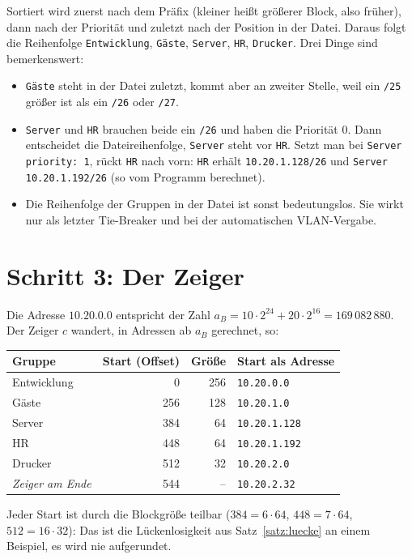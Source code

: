 \documentclass[a4paper,12pt, twoside]{report}
\theoremstyle{definition}
\begin{document}
Sortiert wird zuerst nach dem Präfix (kleiner heißt größerer Block, also früher), dann nach der Priorität und zuletzt nach der Position in der Datei. Daraus folgt die Reihenfolge \texttt{Entwicklung}, \texttt{Gäste}, \texttt{Server}, \texttt{HR}, \texttt{Drucker}. Drei Dinge sind bemerkenswert:
\begin{itemize}
	\item \texttt{Gäste} steht in der Datei zuletzt, kommt aber an zweiter Stelle, weil ein \texttt{/25} größer ist als ein \texttt{/26} oder \texttt{/27}.
	\item \texttt{Server} und \texttt{HR} brauchen beide ein \texttt{/26} und haben die Priorität $0$. Dann entscheidet die Dateireihenfolge, \texttt{Server} steht vor \texttt{HR}. Setzt man bei \texttt{Server} \texttt{priority: 1}, rückt \texttt{HR} nach vorn: \texttt{HR} erhält \texttt{10.20.1.128/26} und \texttt{Server} \texttt{10.20.1.192/26} (so vom Programm berechnet).
	\item Die Reihenfolge der Gruppen in der Datei ist sonst bedeutungslos. Sie wirkt nur als letzter Tie-Breaker und bei der automatischen VLAN-Vergabe.
\end{itemize}

\section{Schritt 3: Der Zeiger}

Die Adresse $10.20.0.0$ entspricht der Zahl $a_B = 10\cdot2^{24} + 20\cdot2^{16} = 169\,082\,880$. Der Zeiger $c$ wandert, in Adressen ab $a_B$ gerechnet, so:

\begin{center}
\small
\begin{tabular}{lrrl}
\toprule
Gruppe & Start (Offset) & Größe & Start als Adresse \\
\midrule
Entwicklung & 0 & 256 & \texttt{10.20.0.0} \\
Gäste & 256 & 128 & \texttt{10.20.1.0} \\
Server & 384 & 64 & \texttt{10.20.1.128} \\
HR & 448 & 64 & \texttt{10.20.1.192} \\
Drucker & 512 & 32 & \texttt{10.20.2.0} \\
\emph{Zeiger am Ende} & 544 & -- & \texttt{10.20.2.32} \\
\bottomrule
\end{tabular}
\end{center}

Jeder Start ist durch die Blockgröße teilbar ($384 = 6\cdot 64$, $448 = 7\cdot 64$, $512 = 16\cdot 32$): Das ist die Lückenlosigkeit aus Satz~\ref{satz:luecke} an einem Beispiel, es wird nie aufgerundet.
\end{document}
